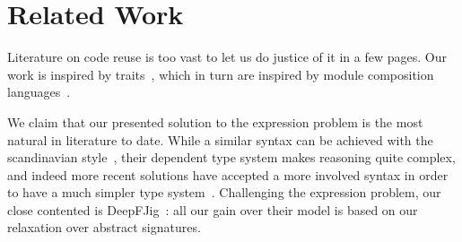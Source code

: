 \saveSpace\saveSpace
\section{Related Work}
\saveSpace\saveSpace
Literature on code reuse is too vast to let us do justice of it in a few pages.
Our work is inspired by traits~\cite{ducasse2006traits}, which in turn
are inspired by module composition languages~\cite{ancona2002calculus}.

We claim that our presented solution to the expression problem is the most natural in literature to date.
While a similar syntax can be achieved with the scandinavian style~\cite{ernst2004expression}, their dependent type system makes reasoning quite complex, and indeed more recent solutions have accepted a more involved syntax in order to have a much simpler type system~\cite{igarashi2005lightweight}.
Challenging the expression problem, our close contented is DeepFJig~\cite{deep}: all our gain over their model is based on our relaxation over abstract signatures.


\saveSpace
